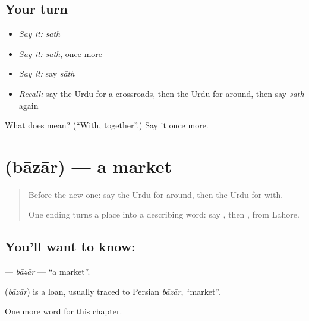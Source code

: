 \subsection*{Your turn}
\begin{itemize}
\raggedright
  \item \emph{Say it:} \emph{sāth}
  \item \emph{Say it:} \emph{sāth}, once more
  \item \emph{Say it:} say \emph{sāth}
  \item \emph{Recall:} say the Urdu for a crossroads, then the Urdu for around, then say \emph{sāth} again
\end{itemize}

\begin{tcolorbox}[breakable,colback=teal!4,colframe=teal!35!black,title={Before you move on}]
What does  mean? (\textquotedblleft{}With, together\textquotedblright{}.) Say it once more.
\end{tcolorbox}
\section[\texorpdfstring{\ur{بازار} (bāzār)}{بازار (bāzār)}]{ (bāzār) — a market}

\label{lesson:UR-C100-bazar}



\begin{quote}
Before the new one: say the Urdu for around, then the Urdu for with.

One ending turns a place into a describing word: say \textbf{}, then \textbf{}, from Lahore.
\end{quote}

\subsection*{You'll want to know: }
\textbf{} — \emph{bāzār} — \textquotedblleft{}a market\textquotedblright{}.

\begin{cousinweb}
\textbf{} (\emph{bāzār}) is a loan, usually traced to Persian \emph{bāzār}, \textquotedblleft{}market\textquotedblright{}.
\end{cousinweb}

\begin{grammarlens}[title={What you've built}]
One more word for this chapter.
\end{grammarlens}

